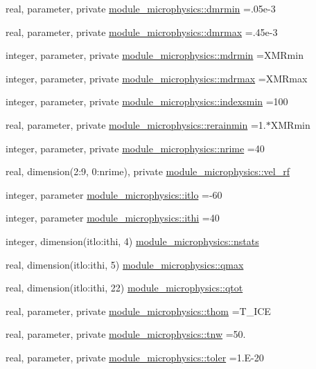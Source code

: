 \begin{DoxyCompactItemize}
\item 
real, parameter, private \hyperlink{namespacemodule__microphysics_a67a841cda9f172633fa4895d1a3433e7}{module\+\_\+microphysics\+::dmrmin} =.\+05e-\/3
\item 
real, parameter, private \hyperlink{namespacemodule__microphysics_a5faae0c4f54f72f04b2874f5588276f5}{module\+\_\+microphysics\+::dmrmax} =.\+45e-\/3
\item 
integer, parameter, private \hyperlink{namespacemodule__microphysics_aa9201f3dba87b517d0fe88af177c4281}{module\+\_\+microphysics\+::mdrmin} =X\+M\+Rmin
\item 
integer, parameter, private \hyperlink{namespacemodule__microphysics_aa21f2a4aa4dc086cbe80493ae7da6b8b}{module\+\_\+microphysics\+::mdrmax} =X\+M\+Rmax
\item 
integer, parameter, private \hyperlink{namespacemodule__microphysics_a48966fa99ac5a7268ef5f473a675eeb2}{module\+\_\+microphysics\+::indexsmin} =100
\item 
real, parameter, private \hyperlink{namespacemodule__microphysics_a86f747f0e2a77aee3a2c8270a0f2fc6d}{module\+\_\+microphysics\+::rerainmin} =1.$\ast$X\+M\+Rmin
\item 
integer, parameter, private \hyperlink{namespacemodule__microphysics_aaea427462ab04c90a0e8188c08e102c2}{module\+\_\+microphysics\+::nrime} =40
\item 
real, dimension(2\+:9, 0\+:nrime), private \hyperlink{namespacemodule__microphysics_a2979744b6713e1ea75813ce1329967c6}{module\+\_\+microphysics\+::vel\+\_\+rf}
\item 
integer, parameter \hyperlink{namespacemodule__microphysics_ada649157311835e0fa4c4d24057d5aa4}{module\+\_\+microphysics\+::itlo} =-\/60
\item 
integer, parameter \hyperlink{namespacemodule__microphysics_aac47e36935bcfaf088e6d0cb266d74f5}{module\+\_\+microphysics\+::ithi} =40
\item 
integer, dimension(itlo\+:ithi, 4) \hyperlink{namespacemodule__microphysics_a8893b7e5e0d04741a7e155c999480f92}{module\+\_\+microphysics\+::nstats}
\item 
real, dimension(itlo\+:ithi, 5) \hyperlink{namespacemodule__microphysics_ae783e9f9007b2cc25590b9e967461ef7}{module\+\_\+microphysics\+::qmax}
\item 
real, dimension(itlo\+:ithi, 22) \hyperlink{namespacemodule__microphysics_a1ca8e1d6e01d0b1bfb406608ccfeff5d}{module\+\_\+microphysics\+::qtot}
\item 
real, parameter, private \hyperlink{namespacemodule__microphysics_ae6cb25c6ef4d76e53988a1390c99bacb}{module\+\_\+microphysics\+::thom} =T\+\_\+\+I\+CE
\item 
real, parameter, private \hyperlink{namespacemodule__microphysics_a7759795319d20ea93e3ceb6755333fa1}{module\+\_\+microphysics\+::tnw} =50.
\item 
real, parameter, private \hyperlink{namespacemodule__microphysics_a14f276771aea75d768df7e65c93e0092}{module\+\_\+microphysics\+::toler} =1.\+E-\/20
\end{DoxyCompactItemize}


